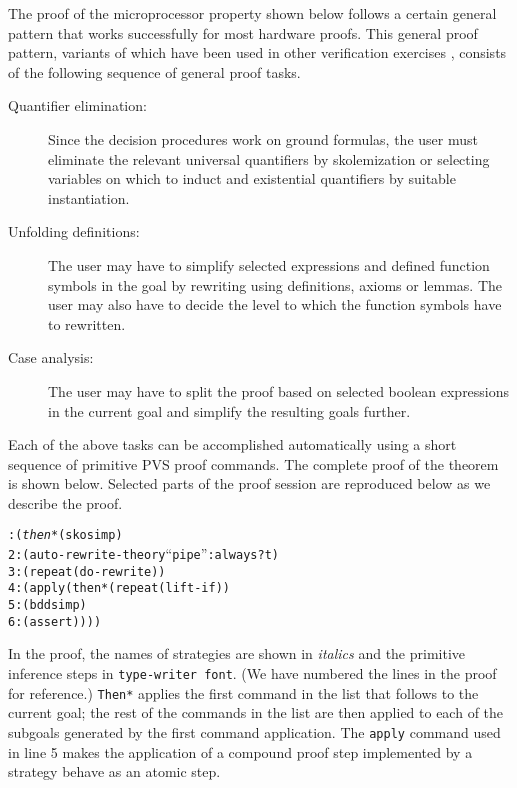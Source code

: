 The proof of the microprocessor property shown below follows a certain
general pattern that works successfully for most hardware proofs.
This general proof pattern, variants of which have been used
in other verification
exercises \cite{mephisto,HOL:super}, consists of the following
sequence of general proof tasks.
\begin{description}
\item[Quantifier elimination:] Since the decision procedures work on
ground formulas, the user must eliminate the relevant universal
quantifiers by skolemization or selecting variables on which to induct
and existential quantifiers by suitable instantiation.

\item[Unfolding definitions:] The user may have to simplify selected
expressions
and defined function symbols in the goal by rewriting using definitions,
axioms or lemmas.
The user may also have to decide the level to which the function symbols have
to rewritten.

\item[Case analysis:] The user may have to split the proof based on
selected boolean expressions in the current goal and simplify the
resulting goals further.
\end{description}

Each of the above tasks can be accomplished automatically using a short
sequence of primitive PVS proof commands.
The complete proof of the theorem is shown below.
Selected parts of the proof session are reproduced below as we describe
the proof.

\mbox{}

\noindent
\begin{boxedminipage}{\textwidth}
\begin{alltt}
{\smaller{}: ({\em then*} (skosimp)
2:         (auto-rewrite-theory ``pipe'' :always? t)
3:         (repeat (do-rewrite))
4:         (apply (then* (repeat (lift-if))
5:                       (bddsimp)
6:                       (assert))))
}
\end{alltt}
\end{boxedminipage}

\mbox{}

In the proof, the names of strategies are shown in {\em italics} and
the primitive inference steps in {\tt type-writer font}.
(We have numbered the lines in the proof for reference.)
{\tt Then*} applies
the first command in the list that follows to the current goal;
the rest of the commands in the list are then applied
to each of the subgoals generated by the first command
application.
The {\tt apply} command used in line 5 makes the application of 
a compound proof step implemented by a strategy behave as
an atomic step.

